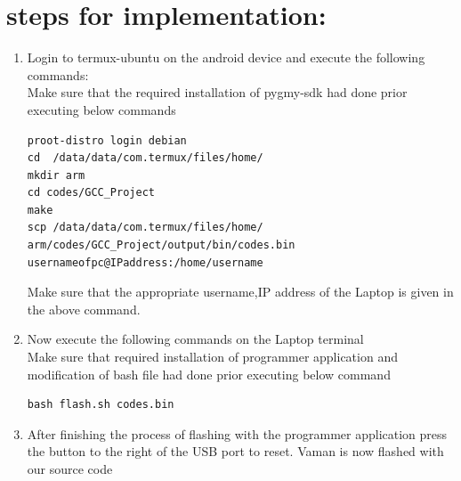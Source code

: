 \documentclass[journal,12pt,twocolumn]{IEEEtran}
\begin{document}
\section*{steps for implementation:} 
\begin{enumerate}
\item Login to termux-ubuntu on the android device and execute the following commands:\\
Make sure that the required installation of pygmy-sdk had done prior executing below commands
\begin{lstlisting}
proot-distro login debian
cd  /data/data/com.termux/files/home/
mkdir arm
cd codes/GCC_Project
make
scp /data/data/com.termux/files/home/
arm/codes/GCC_Project/output/bin/codes.bin 
usernameofpc@IPaddress:/home/username
\end{lstlisting}

Make sure that the appropriate username,IP address of the Laptop is given in the above command.
\item Now execute the following commands on the Laptop terminal\\
Make sure that required installation of programmer application and modification of bash file had done prior executing below command
\begin{lstlisting}
bash flash.sh codes.bin
\end{lstlisting}
\item After finishing the process of flashing with the programmer application press the button to the right of the USB port to reset. Vaman is now flashed with our source code
\end{enumerate}
\end{document}
